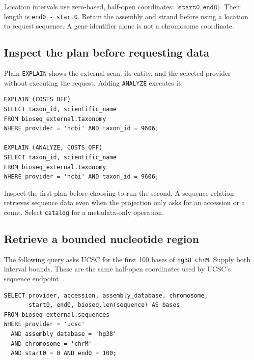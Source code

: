 Location intervals use zero-based, half-open coordinates:
\([\texttt{start0},\texttt{end0})\). Their length is
\texttt{end0 - start0}. Retain the assembly and strand before using a location
to request sequence. A gene identifier alone is not a chromosome coordinate.

\subsection{Inspect the plan before requesting data}

Plain \texttt{EXPLAIN} shows the external scan, its entity, and the selected
provider without executing the request. Adding \texttt{ANALYZE} executes it.

\par\noindent\begin{minipage}{\linewidth}
\begin{lstlisting}[style=bioseq-appendix-sql]
EXPLAIN (COSTS OFF)
SELECT taxon_id, scientific_name
FROM bioseq_external.taxonomy
WHERE provider = 'ncbi' AND taxon_id = 9606;

EXPLAIN (ANALYZE, COSTS OFF)
SELECT taxon_id, scientific_name
FROM bioseq_external.taxonomy
WHERE provider = 'ncbi' AND taxon_id = 9606;
\end{lstlisting}
\end{minipage}

Inspect the first plan before choosing to run the second. A sequence relation
retrieves sequence data even when the projection only asks for an accession
or a count. Select \texttt{catalog} for a metadata-only operation.

\subsection{Retrieve a bounded nucleotide region}

The following query asks UCSC for the first 100 bases of \texttt{hg38 chrM}.
Supply both interval bounds. These are the same half-open coordinates used
by UCSC's sequence endpoint~\autocite{ucsc_rest_api}.

\par\noindent\begin{minipage}{\linewidth}
\begin{lstlisting}[style=bioseq-appendix-sql]
SELECT provider, accession, assembly_database, chromosome,
       start0, end0, bioseq.len(sequence) AS bases
FROM bioseq_external.sequences
WHERE provider = 'ucsc'
  AND assembly_database = 'hg38'
  AND chromosome = 'chrM'
  AND start0 = 0 AND end0 = 100;
\end{lstlisting}
\end{minipage}

